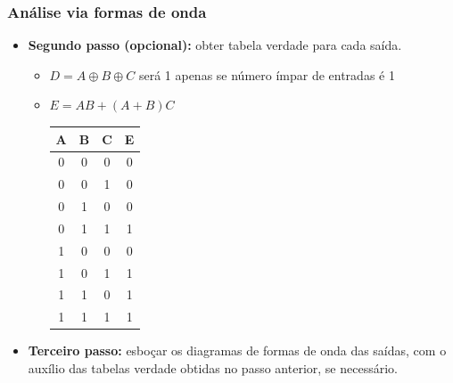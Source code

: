 \documentclass{beamer}
\begin{document}
\begin{frame}
\frametitle{Análise via formas de onda}

\begin{itemize}
\item \textbf{Segundo passo (opcional):} obter tabela verdade para cada
saída.
\pause
\begin{itemize}
\item $D = A \oplus B \oplus C$ será 1 apenas se número ímpar de entradas é 1
\pause
\item $E = AB + (A+B)C$\\[6pt]
\pause
\begin{tabular}{ccc||c}
A & B & C & E \\
\hline
0 & 0 & 0 & 0 \\
0 & 0 & 1 & 0 \\
0 & 1 & 0 & 0 \\
0 & 1 & 1 & 1 \\
1 & 0 & 0 & 0 \\
1 & 0 & 1 & 1 \\
1 & 1 & 0 & 1 \\
1 & 1 & 1 & 1
\end{tabular}
\end{itemize}
\pause
\item \textbf{Terceiro passo: } esboçar os diagramas de formas de onda das saídas, com o auxílio das tabelas verdade obtidas no passo anterior, se necessário.
\end{itemize}

\end{frame}

\end{document}
